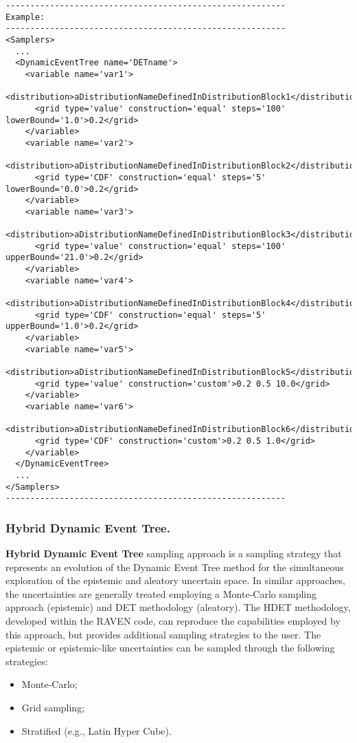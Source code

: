 \begin{lstlisting}[style=XML]
---------------------------------------------------------
Example:
---------------------------------------------------------
<Samplers>
  ...
  <DynamicEventTree name='DETname'> 
    <variable name='var1'> 
      <distribution>aDistributionNameDefinedInDistributionBlock1</distribution> 
      <grid	type='value' construction='equal' steps='100' lowerBound='1.0'>0.2</grid>	
    </variable> 
    <variable name='var2'> 
      <distribution>aDistributionNameDefinedInDistributionBlock2</distribution> 
      <grid	type='CDF' construction='equal' steps='5' lowerBound='0.0'>0.2</grid>	
    </variable>
    <variable name='var3'> 
      <distribution>aDistributionNameDefinedInDistributionBlock3</distribution> 
      <grid	type='value' construction='equal' steps='100' upperBound='21.0'>0.2</grid>	
    </variable> 
    <variable name='var4'> 
      <distribution>aDistributionNameDefinedInDistributionBlock4</distribution> 
      <grid	type='CDF' construction='equal' steps='5' upperBound='1.0'>0.2</grid>	
    </variable>
    <variable name='var5'> 
      <distribution>aDistributionNameDefinedInDistributionBlock5</distribution> 
      <grid	type='value' construction='custom'>0.2 0.5 10.0</grid>	
    </variable> 
    <variable name='var6'> 
      <distribution>aDistributionNameDefinedInDistributionBlock6</distribution> 
      <grid	type='CDF' construction='custom'>0.2 0.5 1.0</grid>	
    </variable>
  </DynamicEventTree>
  ...
</Samplers>
---------------------------------------------------------
\end{lstlisting}

\subsubsection{Hybrid Dynamic Event Tree.}
\label{subsubsubsec:HDET}
\textbf{Hybrid Dynamic Event Tree} sampling approach is a sampling strategy that represents an evolution of the Dynamic Event Tree method for the simultaneous exploration of the epistemic and aleatory uncertain space.
In similar approaches,  the uncertainties are generally treated employing a Monte-Carlo sampling approach (epistemic) and DET methodology (aleatory).  The HDET methodology, developed within the RAVEN code, can reproduce the capabilities employed by this approach, but provides additional sampling strategies to the user. The epistemic or epistemic-like uncertainties can be sampled through the following strategies:
\begin{itemize}
\item Monte-Carlo;
\item Grid sampling;
\item Stratified (e.g., Latin Hyper Cube).
\end{itemize}

